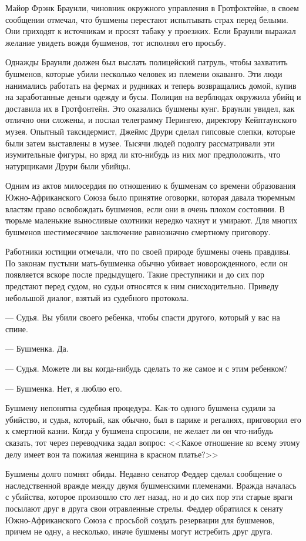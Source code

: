 \documentclass[12pt,a4paper,twoside,openany,svgnames]{memoir}
\begin{document}
Майор Фрэнк Браунли, чиновник окружного управления в Гротфоктейне, в своем сообщении отмечал, что бушмены перестают испытывать страх перед белыми. Они приходят к источникам и просят табаку у проезжих. Если Браунли выражал желание увидеть вождя бушменов, тот исполнял его просьбу.

Однажды Браунли должен был выслать полицейский патруль, чтобы захватить бушменов, которые убили несколько человек из племени окаванго. Эти люди нанимались работать на фермах и рудниках и теперь возвращались домой, купив на заработанные деньги одежду и бусы. Полиция на верблюдах окружила убийц и доставила их в Гротфонтейн. Это оказались бушмены кунг. Браунли увидел, как отлично они сложены, и послал телеграмму Перингею, директору Кейптаунского музея. Опытный таксидермист, Джеймс Друри сделал гипсовые слепки, которые были затем выставлены в музее. Тысячи людей подолгу рассматривали эти изумительные фигуры, но вряд ли кто-нибудь из них мог предположить, что натурщиками Друри были убийцы.

Одним из актов милосердия по отношению к бушменам со времени образования Южно-Африканского Союза было принятие оговорки, которая давала тюремным властям право освобождать бушменов, если они в очень плохом состоянии. В тюрьме маленькие выносливые охотники нередко чахнут и умирают. Для многих бушменов шестимесячное заключение равнозначно смертному приговору.

Работники юстиции отмечали, что по своей природе бушмены очень правдивы. По законам пустыни мать-бушменка обычно убивает новорожденного, если он появляется вскоре после предыдущего. Такие преступники и до сих пор предстают перед судом, но судьи относятся к ним снисходительно. Приведу небольшой диалог, взятый из судебного протокола.

--- Судья. Вы убили своего ребенка, чтобы спасти другого, который у вас на спине.

--- Бушменка. Да.

--- Судья. Можете ли вы когда-нибудь сделать то же самое и с этим ребенком?

--- Бушменка. Нет, я люблю его.

Бушмену непонятна судебная процедура. Как-то одного бушмена судили за убийство, и судья, который, как обычно, был в парике и регалиях, приговорил его к смертной казни. Когда у бушмена спросили, не желает ли он что-нибудь сказать, тот через переводчика задал вопрос: <<Какое отношение ко всему этому делу имеет вон та пожилая женщина в красном платье?>>

Бушмены долго помнят обиды. Недавно сенатор Феддер сделал сообщение о наследственной вражде между двумя бушменскими племенами. Вражда началась с убийства, которое произошло сто лет назад, но и до сих пор эти старые враги посылают друг в друга свои отравленные стрелы. Феддер обратился к сенату Южно-Африканского Союза с просьбой создать резервации для бушменов, причем не одну, а несколько, иначе бушмены могут истребить друг друга.
\end{document}
